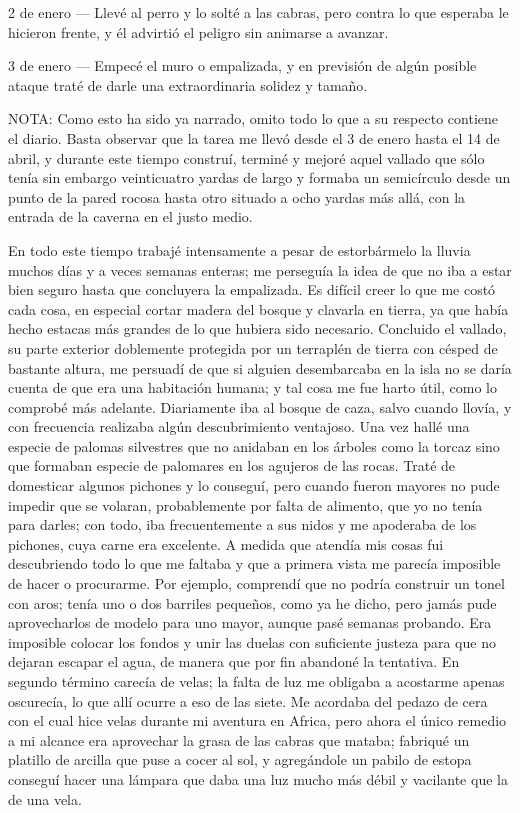 \documentclass{novela}
\begin{document}
    2  de enero — Llevé al perro y lo solté a las cabras, pero contra lo que esperaba le hicieron frente, y él advirtió el peligro sin animarse a avanzar.


    3  de enero — Empecé el muro o empalizada, y en previsión de algún posible ataque traté de darle una extraordinaria solidez y tamaño.


    NOTA: Como esto ha sido ya narrado, omito todo lo que a su respecto contiene el diario. Basta observar que la tarea me llevó desde el 3 de enero hasta el 14 de abril, y durante este tiempo construí, terminé y mejoré aquel vallado que sólo tenía sin embargo veinticuatro yardas de largo y formaba un semicírculo desde un punto de la pared rocosa hasta otro situado a ocho yardas más allá, con la entrada de la caverna en el justo medio.


    En todo este tiempo trabajé intensamente a pesar de estorbármelo la lluvia muchos días y a veces semanas enteras; me perseguía la idea de que no iba a estar bien seguro hasta que concluyera la empalizada. Es difícil creer lo que me costó cada cosa, en especial cortar madera del bosque y clavarla en tierra, ya que había hecho estacas más grandes de lo que hubiera sido necesario.
    Concluido el vallado, su parte exterior doblemente protegida por un terraplén de tierra con césped de bastante altura, me persuadí de que si alguien desembarcaba en la isla no se daría cuenta de que era una habitación humana; y tal cosa me fue harto útil, como lo comprobé más adelante.
    Diariamente iba al bosque de caza, salvo cuando llovía, y con frecuencia realizaba algún descubrimiento ventajoso. Una vez hallé una especie de palomas silvestres que no anidaban en los árboles como la torcaz sino que formaban especie de palomares en los agujeros de las rocas. Traté de domesticar algunos pichones y lo conseguí, pero cuando fueron mayores no pude impedir que se volaran, probablemente por falta de alimento, que yo no tenía para darles; con todo, iba frecuentemente a sus nidos y me apoderaba de los pichones, cuya carne era excelente.
    A medida que atendía mis cosas fui descubriendo todo lo que me faltaba y que a primera vista me parecía imposible de hacer o procurarme. Por ejemplo, comprendí que no podría construir un tonel con aros; tenía uno o dos barriles pequeños, como ya he dicho, pero jamás pude aprovecharlos de modelo para uno mayor, aunque pasé semanas probando. Era imposible colocar los fondos y unir las duelas con suficiente justeza para que no dejaran escapar el agua, de manera que por fin abandoné la tentativa.
    En segundo término carecía de velas; la falta de luz me obligaba a acostarme apenas oscurecía, lo que allí ocurre a eso de las siete. Me acordaba del pedazo de cera con el cual hice velas durante mi aventura en Africa, pero ahora el único remedio a mi alcance era aprovechar la grasa de las cabras que mataba; fabriqué un platillo de arcilla que puse a cocer al sol, y agregándole un pabilo de estopa conseguí hacer una lámpara que daba una luz mucho más débil y vacilante que la de una vela.
\end{document}

